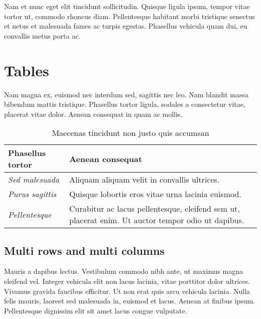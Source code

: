 Nam et nunc eget elit tincidunt sollicitudin. Quisque ligula ipsum, tempor vitae tortor ut, commodo rhoncus diam. Pellentesque habitant morbi tristique senectus et netus et malesuada fames ac turpis egestas. Phasellus vehicula quam dui, eu convallis metus porta ac.


\section{Tables}

Nam magna ex, euismod nec interdum sed, sagittis nec leo. Nam blandit massa bibendum mattis tristique. Phasellus tortor ligula, sodales a consectetur vitae, placerat vitae dolor. Aenean consequat in quam ac mollis. 

\begin{table}[H]
	\centering
	\begin{tabular}{ | m{} | m{} | }
		\hline
		\textbf{Phasellus tortor} & \textbf{Aenean consequat} \\
		\hline \hline
		\emph{Sed malesuada} & Aliquam aliquam velit in convallis ultrices. \\
		\hline
		\emph{Purus sagittis} &  Quisque lobortis eros vitae urna lacinia euismod. \\
		\hline
		\emph{Pellentesque} & Curabitur ac lacus pellentesque, eleifend sem ut, placerat enim. Ut auctor tempor odio ut dapibus. \\
		\hline
	\end{tabular}
	\caption{Maecenas tincidunt non justo quis accumsan}
	\label{tab:example-1}
\end{table}

\subsection{Multi rows and multi columns}

Mauris a dapibus lectus. Vestibulum commodo nibh ante, ut maximus magna eleifend vel. Integer vehicula elit non lacus lacinia, vitae porttitor dolor ultrices. Vivamus gravida faucibus efficitur. Ut non erat quis arcu vehicula lacinia. Nulla felis mauris, laoreet sed malesuada in, euismod et lacus. Aenean at finibus ipsum. Pellentesque dignissim elit sit amet lacus congue vulputate.

